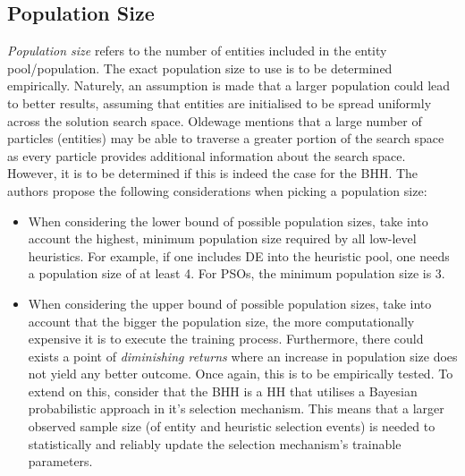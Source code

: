 \subsection{Population Size}
\label{sec:bhh:hyper_parameters:population_size}

\textit{Population size} refers to the number of entities included in the entity pool/population. The exact population size to use is to be determined empirically. Naturely, an assumption is made that a larger population could lead to better results, assuming that entities are initialised to be spread uniformly across the solution search space. Oldewage \cite{ref:oldewage:2017} mentions that a large number of particles (entities) may be able to traverse a greater portion of the search space as every particle provides additional information about the search space. However, it is to be determined if this is indeed the case for the \ac{BHH}. The authors propose the following considerations when picking a population size:

\begin{itemize}
    \item When considering the lower bound of possible population sizes, take into account the highest, minimum population size required by all low-level heuristics. For example, if one includes \Ac{DE} into the heuristic pool, one needs a population size of at least 4. For \acp{PSO}, the minimum population size is 3.
    \item When considering the upper bound of possible population sizes, take into account that the bigger the population size, the more computationally expensive it is to execute the training process. Furthermore, there could exists a point of \textit{diminishing returns} where an increase in population size does not yield any better outcome. Once again, this is to be empirically tested. To extend on this, consider that the \Ac{BHH} is a \Ac{HH} that utilises a Bayesian probabilistic approach in it's selection mechanism. This means that a larger observed sample size (of entity and heuristic selection events) is needed to statistically and reliably update the selection mechanism's trainable parameters.
\end{itemize}

